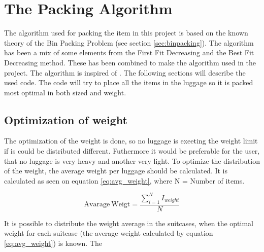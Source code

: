 \section{The Packing Algorithm}
\label{sec:algorithm}
The algorithm used for packing the item in this project is based on the known theory of the Bin Packing Problem (see section \ref{sec:binpacking}). The algorithm has been a mix of some elements from the First Fit Decreasing and the Best Fit Decreasing method. These has been combined to make the algorithm used in the project. The algorithm is inspired of \citet{three-dim-pack}. The following sections will describe the used code.
The code will try to place all the items in the luggage so it is packed most optimal in both sized and weight.

\subsection{Optimization of weight}
The optimization of the weight is done, so no luggage is exeeting the weight limit if is could be distributed different. Futhermore it would be preferable for the user, that no luggage is very heavy and another very light.
To optimize the distribution of the weight, the average weight per luggage should be calculated. It is calculated as seen on equation \ref{eq:avg_weight}, where N = Number of items.

\begin{equation}
	\label{eq:avg_weight}
	\mathrm{Avarage~Weigt} = \frac{\displaystyle\sum_{i=1}^{N} I_{weight}}{N}
\end{equation}

It is possible to distribute the weight average in the suitcases, when the optimal weight for each suitcase (the average weight calculated by equation \ref{eq:avg_weight}) is known. The 